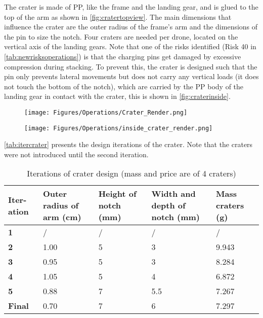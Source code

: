 The crater is made of PP, like the frame and the landing gear, and is glued to the top of the arm as shown in \autoref{fig:cratertopview}. The main dimensions that influence the crater are the outer radius of the frame's arm and the dimensions of the pin to size the notch. Four craters are needed per drone, located on the vertical axis of the landing gears. Note that one of the risks identified (Risk 40 in \autoref{tab:newrisksoperations}) is that the charging pins get damaged by excessive compression during stacking. To prevent this, the crater is designed such that the pin only prevents lateral movements but does not carry any vertical loads (it does not touch the bottom of the notch), which are carried by the PP body of the landing gear in contact with the crater, this is shown in \autoref{fig:craterinside}. 

\begin{figure}[h]
\centering
\begin{minipage}{.5\textwidth}
  \centering
  \texttt{[image: Figures/Operations/Crater\_Render.png]}
  \label{fig:cratertopview}
\end{minipage}%
\begin{minipage}{.5\textwidth}
  \centering
  \texttt{[image: Figures/Operations/inside\_crater\_render.png]}
  \label{fig:craterinside}
\end{minipage}
\end{figure}


\autoref{tab:itercrater} presents the design iterations of the crater. Note that the craters were not introduced until the second iteration.

\begin{longtable}[c]{|p{1cm}|p{3cm}|p{2cm}|p{3cm}|p{2cm}|}
\caption{Iterations of crater design (mass and price are of 4 craters)}
\label{tab:itercrater}\\
\hline
\textbf{Iter- ation} & \textbf{Outer radius of arm (cm)} & \textbf{Height of notch (mm)} & \textbf{Width and depth of notch (mm)} & \textbf{Mass craters (g)} \\ \hline
\endfirsthead
%
\endhead
%
\textbf{1} & / & / & / & / \\ \hline
\textbf{2} & 1.00 & 5 & 3 & 9.943 \\ \hline
\textbf{3} & 0.95 & 5 & 3 & 8.284 \\ \hline
\textbf{4} & 1.05 & 5 & 4 & 6.872 \\ \hline
\textbf{5} & 0.88 & 7 & 5.5 & 7.267 \\ \hline
\rowcolor[HTML]{DDEBF7} 
\textbf{Final} & 0.70 & 7 & 6 & 7.297 \\ \hline
\end{longtable}

